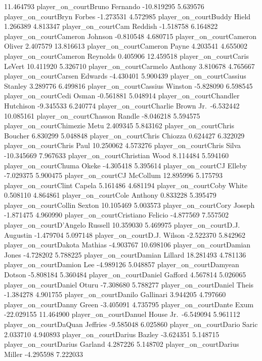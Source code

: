 \documentclass[
  landscape]{article}
\begin{document}
11.464793 player\_on\_courtBruno Fernando -10.819295 5.639576
player\_on\_courtBryn Forbes -1.273531 4.572985 player\_on\_courtBuddy
Hield 1.266389 4.813347 player\_on\_courtCam Reddish -1.518758 6.164822
player\_on\_courtCameron Johnson -0.810548 4.680715
player\_on\_courtCameron Oliver 2.407579 13.816613
player\_on\_courtCameron Payne 4.203541 4.655002
player\_on\_courtCameron Reynolds 0.405906 12.459518
player\_on\_courtCaris LeVert 10.411920 5.326710
player\_on\_courtCarmelo Anthony 3.810678 4.765667
player\_on\_courtCarsen Edwards -4.430401 5.900439
player\_on\_courtCassius Stanley 3.289776 6.499816
player\_on\_courtCassius Winston -5.828090 6.598545
player\_on\_courtCedi Osman -0.561881 5.048914 player\_on\_courtChandler
Hutchison -9.345533 6.240774 player\_on\_courtCharlie Brown
Jr.~-6.532442 10.085161 player\_on\_courtChasson Randle -8.046218
5.594575 player\_on\_courtChimezie Metu 2.409345 5.843162
player\_on\_courtChris Boucher 6.830299 5.048848 player\_on\_courtChris
Chiozza 0.624427 6.322029 player\_on\_courtChris Paul 10.250062 4.573276
player\_on\_courtChris Silva -10.345669 7.967633
player\_on\_courtChristian Wood 8.114484 5.594160 player\_on\_courtChuma
Okeke -4.305418 5.395614 player\_on\_courtCJ Elleby -7.029375 5.900475
player\_on\_courtCJ McCollum 12.895996 5.175793 player\_on\_courtClint
Capela 5.161486 4.681194 player\_on\_courtCoby White 0.508110 4.864861
player\_on\_courtCole Anthony 0.833228 5.395479 player\_on\_courtCollin
Sexton 10.105469 5.003573 player\_on\_courtCory Joseph -1.871475
4.960990 player\_on\_courtCristiano Felicio -4.877569 7.557502
player\_on\_courtD'Angelo Russell 10.359030 5.469975
player\_on\_courtD.J. Augustin -1.479704 5.097148 player\_on\_courtD.J.
Wilson -2.522370 5.842962 player\_on\_courtDakota Mathias -4.903767
10.698106 player\_on\_courtDamian Jones -4.728202 5.788225
player\_on\_courtDamian Lillard 18.281493 4.781136
player\_on\_courtDamion Lee -4.989126 5.048857 player\_on\_courtDamyean
Dotson -5.808184 5.360484 player\_on\_courtDaniel Gafford 4.567814
5.026065 player\_on\_courtDaniel Oturu -7.308680 5.788277
player\_on\_courtDaniel Theis -1.384278 4.901755 player\_on\_courtDanilo
Gallinari 3.944205 4.797660 player\_on\_courtDanny Green -3.405091
4.735795 player\_on\_courtDante Exum -22.029155 11.464900
player\_on\_courtDanuel House Jr.~-6.549094 5.961112
player\_on\_courtDaQuan Jeffries -9.585048 6.025860
player\_on\_courtDario Saric 2.033710 4.940893 player\_on\_courtDarius
Bazley -3.624351 5.148715 player\_on\_courtDarius Garland 4.287226
5.148702 player\_on\_courtDarius Miller -4.295598 7.222033
\end{document}
